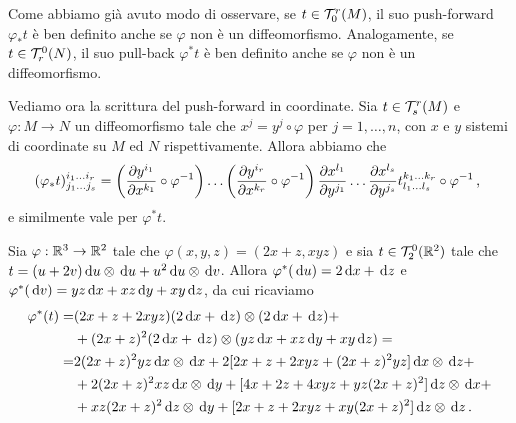\begin{remark}
	Come abbiamo già avuto modo di osservare, se $t\in\mathcal T_0^r(M)$, il suo push-forward $\varphi_*t$ è ben definito anche se $\varphi$ non è un diffeomorfismo. Analogamente, se $t \in \mathcal T_r^0(N)$, il suo pull-back $\varphi^*t$ è ben definito anche se $\varphi$ non è un diffeomorfismo.
\end{remark}

Vediamo ora la scrittura del push-forward in coordinate. Sia $t\in \mathcal T_s^r(M)$ e $\varphi:M\to N$ un diffeomorfismo tale che $x^j = y^j\circ \varphi$ per $j=1,\ldots,n$, con $x$ e $y$ sistemi di coordinate su $M$ ed $N$ rispettivamente. Allora abbiamo che %
\begin{equation*}
	(\varphi_*t)_{j_1\ldots j_s}^{i_1\ldots i_r} =\left(\frac{\partial y^{i_1}}{\partial x^{k_1}}\circ \varphi^{-1}\right)\dots \left(\frac{\partial y^{i_r}}{\partial x^{k_r}} \circ \varphi^{-1}\right) \frac{\partial x^{l_1}}{\partial y^{j_1}} \dots \frac{\partial x^{l_s}}{\partial y^{j_s}} t_{l_1\ldots l_s}^{k_1\ldots k_r} \circ \varphi^{-1} \, \text{, }
\end{equation*}
e similmente vale per $\varphi^*t$.



\begin{example}
	Sia $\varphi:\mathbb R^3\to\mathbb R^2$ tale che $\varphi(x,y,z) = (2x+z,xyz)$ e sia $t\in \mathcal T_2^0(\mathbb R^2)$ tale che $t = (u+2v)\,\mathrm d u\otimes \,\mathrm d u + u^2 \,\mathrm d u \otimes \,\mathrm d v$.
	Allora $\varphi^*(\,\mathrm d u) = 2\,\mathrm d x +\,\mathrm d z$ e $\varphi^*(\,\mathrm d v) = yz \,\mathrm d x + xz \,\mathrm d y + xy \,\mathrm d z$, da cui ricaviamo
	\begin{align*}
	\varphi^*(t) =& (2x+z + 2xyz) (2\,\mathrm d x + \,\mathrm d z) \otimes (2\,\mathrm d x + \,\mathrm d z)+ \\
	&+ (2x+z)^2 (2\,\mathrm d x + \,\mathrm d z) \otimes (yz \,\mathrm d x + xz \,\mathrm d y + xy \,\mathrm d z) = \\
	=&2 (2x+z)^2 yz \,\mathrm d x \otimes \,\mathrm d x +  2 [2x + z + 2xyz + (2x + z)^2 yz] \,\mathrm d x \otimes \,\mathrm d z  +\\
	&+ 2 (2x+z)^2 xz \,\mathrm d x \otimes \,\mathrm d y + [4x + 2z + 4xyz + yz (2x+z)^2] \,\mathrm d z \otimes \,\mathrm d x +  \\
        &+ xz (2x+z)^2 \,\mathrm d z \otimes \,\mathrm d y + [2x + z + 2xyz + xy (2x+z)^2] \,\mathrm d z \otimes \,\mathrm d z \, \text{. }
	\end{align*}
\end{example}














